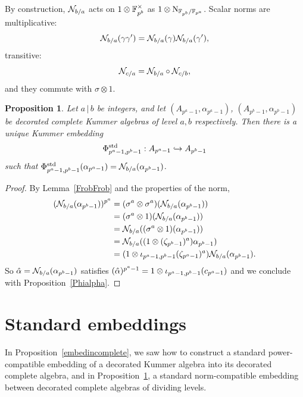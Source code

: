 \documentclass[sigconf]{acmart}
\newtheorem{proposition}[theorem]{Proposition}
\begin{document}
By construction, $\mathcal{N}_{b/a}$ acts on $1\otimes\mathbb{F}_{p^b}^\times$ as $1\otimes\operatorname{N}_{\mathbb{F}_{p^b}/\mathbb{F}_{p^a}}$.
Scalar norms are multiplicative:
\[
  \mathcal{N}_{b/a}(\gamma\gamma')=\mathcal{N}_{b/a}(\gamma)\mathcal{N}_{b/a}(\gamma'),
\]
transitive: \[ \mathcal{N}_{c/a} = \mathcal{N}_{b/a}\circ\mathcal{N}_{c/b},\] and they
commute with $\sigma\otimes1$.
\begin{proposition}
\label{embedcomplete}
Let $a\,|\,b$ be integers,
and let $(A_{p^a-1},\alpha_{p^a-1})$, $(A_{p^b-1},\alpha_{p^b-1})$ be decorated complete Kummer algebras
of level $a,b$ respectively.
Then there is a unique Kummer embedding
\[ {\Phi^{\mathrm{std}}_{{p^a-1},{p^b-1}}}:A_{p^a-1}\hookrightarrow A_{p^b-1} \]
such that ${\Phi^{\mathrm{std}}_{{p^a-1},{p^b-1}}}(\alpha_{p^a-1})=\mathcal{N}_{b/a}(\alpha_{p^b-1})$.
\end{proposition}
\begin{proof}
By Lemma~\ref{FrobFrob} and the properties of the norm,
\begin{equation*}
\begin{split}
(\mathcal{N}_{b/a}(\alpha_{p^b-1}))^{p^a}&=(\sigma^a\otimes\sigma^a)(\mathcal{N}_{b/a}(\alpha_{p^b-1}))\\
&=(\sigma^a\otimes1)(\mathcal{N}_{b/a}(\alpha_{p^b-1}))\\
&=\mathcal{N}_{b/a}((\sigma^a\otimes1)(\alpha_{p^b-1}))\\
&=\mathcal{N}_{b/a}((1\otimes(\zeta_{p^b-1})^a)\alpha_{p^b-1})\\
&=(1\otimes{\iota_{{p^a-1},{p^b-1}}}(\zeta_{p^a-1})^a)\mathcal{N}_{b/a}(\alpha_{p^b-1}).
\end{split}
\end{equation*}
So $\hat\alpha=\mathcal{N}_{b/a}(\alpha_{p^b-1})$
satisfies $(\hat{\alpha})^{p^a-1}=1\otimes{\iota_{{p^a-1},{p^b-1}}}(c_{p^a-1})$
and we conclude with Proposition~\ref{Phialpha}.
\end{proof}



\section{Standard embeddings}
\label{sec:construction}

In Proposition~\ref{embedincomplete}, we saw how to construct a standard
power-compatible embedding of a decorated Kummer algebra into
its decorated complete algebra,
and in Proposition~\ref{embedcomplete}, a standard
norm-compatible embedding between decorated complete algebras
of dividing levels.
 
\end{document}
